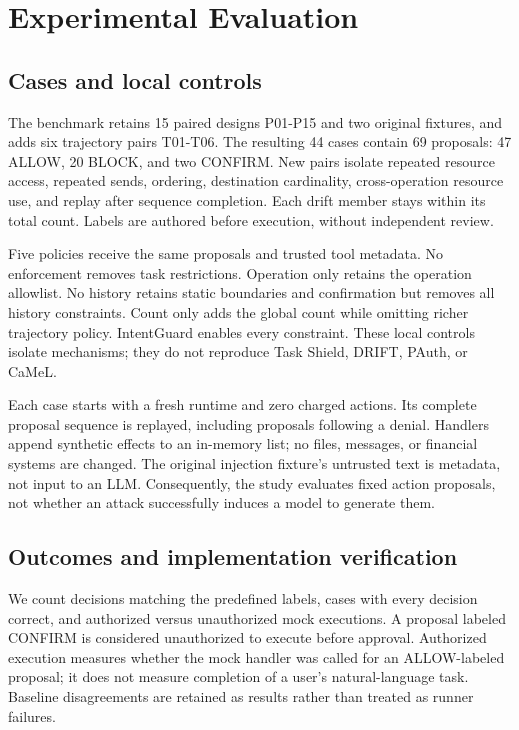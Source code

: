 \documentclass[conference,letterpaper]{IEEEtran}
\begin{document}
\section{Experimental Evaluation}

\subsection{Cases and local controls}

The benchmark retains 15 paired designs P01-P15 and two original fixtures, and adds six trajectory pairs T01-T06. The resulting 44 cases contain 69 proposals: 47 ALLOW, 20 BLOCK, and two CONFIRM. New pairs isolate repeated resource access, repeated sends, ordering, destination cardinality, cross-operation resource use, and replay after sequence completion. Each drift member stays within its total count. Labels are authored before execution, without independent review.


Five policies receive the same proposals and trusted tool metadata. No enforcement removes task restrictions. Operation only retains the operation allowlist. No history retains static boundaries and confirmation but removes all history constraints. Count only adds the global count while omitting richer trajectory policy. IntentGuard enables every constraint. These local controls isolate mechanisms; they do not reproduce Task Shield, DRIFT, PAuth, or CaMeL.


Each case starts with a fresh runtime and zero charged actions. Its complete proposal sequence is replayed, including proposals following a denial. Handlers append synthetic effects to an in-memory list; no files, messages, or financial systems are changed. The original injection fixture's untrusted text is metadata, not input to an LLM. Consequently, the study evaluates fixed action proposals, not whether an attack successfully induces a model to generate them.


\subsection{Outcomes and implementation verification}

We count decisions matching the predefined labels, cases with every decision correct, and authorized versus unauthorized mock executions. A proposal labeled CONFIRM is considered unauthorized to execute before approval. Authorized execution measures whether the mock handler was called for an ALLOW-labeled proposal; it does not measure completion of a user's natural-language task. Baseline disagreements are retained as results rather than treated as runner failures.
\end{document}
